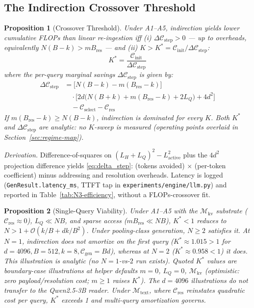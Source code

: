 \documentclass[conference]{IEEEtran}
\newtheorem{proposition}{Proposition}
\begin{document}
{\enlargethispage{2\baselineskip}
\subsection{The Indirection Crossover Threshold}

\begin{proposition}[Crossover Threshold]\label{prop:crossover}
Under A1--A5, indirection
yields lower cumulative FLOPs than linear re-ingestion iff
(i) $\Delta\mathcal{C}_{\mathrm{step}} > 0$ --- up to overheads, equivalently
 $N(B-k) > mB_{\text{res}}$ --- and (ii) $K > K^\ast =
\mathcal{C}_{\mathrm{init}}/\Delta\mathcal{C}_{\mathrm{step}}$:
\begin{equation}
K^* = \frac{\mathcal{C}_{\mathrm{init}}}{\Delta\mathcal{C}_{\mathrm{step}}}
\end{equation}
where the per-query marginal savings $\Delta\mathcal{C}_{\mathrm{step}}$ is given by:
\begin{align}\label{eq:delta_step}
\Delta\mathcal{C}_{\mathrm{step}} &= \big[N(B-k) - m(B_{\mathrm{res}}{-}k)\big] \nonumber \\
&\quad \cdot \Big[2d\big(N(B{+}k) + m(B_{\mathrm{res}}{-}k) + 2L_Q\big) + 4d^2\Big] \nonumber \\
&\quad - \mathcal{C}_{\mathrm{select}} - \mathcal{C}_{\mathrm{res}}
\end{align}
If $m(B_{\mathrm{res}}{-}k) \geq N(B-k)$,
indirection is dominated for every $K$. Both $K^\ast$ and $\Delta\mathcal{C}_{\mathrm{step}}$ are analytic: no $K$-sweep is measured (operating points overlaid in Section~\ref{sec:regime-map}).
\end{proposition}

\textit{Derivation.} Difference-of-squares on $(L_H{+}L_Q)^2 - L_{\mathrm{active}}^2$ plus the $4d^2$ projection difference yields \eqref{eq:delta_step}: (tokens avoided) $\times$ (per-token coefficient) minus addressing and resolution overheads. Latency is logged (\texttt{GenResult.latency\_ms}, TTFT tap in \texttt{experiments/engine/llm.py}) and reported in Table~\ref{tab:N3-efficiency}, without a FLOPs-crossover fit.

\begin{proposition}[Single-Query Viability]\label{prop:single_query}
Under A1--A5 with the $\mathcal{M}_{\text{kv}}$ substrate ($\mathcal{C}_{\mathrm{res}}\approx 0$), $L_Q \ll NB$, and sparse access ($mB_{\text{res}} \ll NB$), $K^* < 1$ reduces to $N > 1 + \mathcal{O}(k/B + dk/B^2)$. Under pooling-class generation, $N \ge 2$ satisfies it. At $N=1$, indirection does not amortize on the first query ($K^* \approx 1.015 > 1$ for $d=4096, B=512, k=8, \mathcal{C}_{\mathrm{gen}}=Bd$), whereas at $N=2$ ($K^* \approx 0.958 < 1$) it does. This illustration is analytic (no $N{=}1$-vs-$2$ run exists). Quoted $K^*$ values are boundary-case illustrations at helper defaults $m{=}0$, $L_Q{=}0$, $\mathcal{M}_{\mathrm{kv}}$ (optimistic: zero payload/resolution cost; $m{\ge}1$ raises $K^*$). The $d{=}4096$ illustrations do not transfer to the Qwen2.5-3B reader. Under $\mathcal{M}_{\text{text}}$, where $\mathcal{C}_{\mathrm{res}}$ reinstates quadratic cost per query, $K^*$ exceeds 1 and multi-query amortization governs.
\end{proposition}

}
\end{document}
